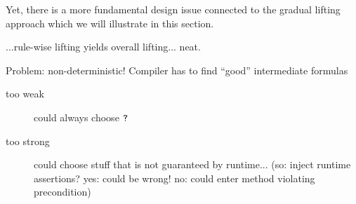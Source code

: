 Yet, there is a more fundamental design issue connected to the gradual lifting approach which we will illustrate in this section.

...rule-wise lifting yields overall lifting... neat.

Problem: non-deterministic! Compiler has to find “good” intermediate formulas
\begin{description}
    \item[too weak] could always choose $\textup{\texttt{?}}$
    \item[too strong] could choose stuff that is not guaranteed by runtime... (so: inject runtime assertions? yes: could be wrong! no: could enter method violating precondition)
\end{description}
